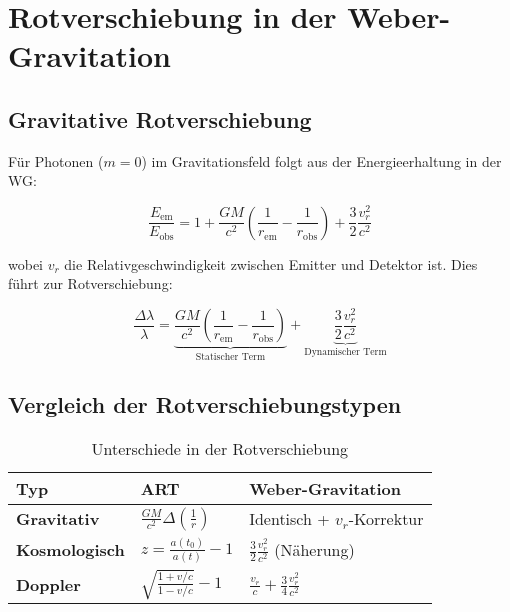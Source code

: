 \newpage
\section{Rotverschiebung in der Weber-Gravitation}

\subsection{Gravitative Rotverschiebung}
Für Photonen ($m=0$) im Gravitationsfeld folgt aus der Energieerhaltung in der WG:

\begin{equation}
\frac{E_\text{em}}{E_\text{obs}} = 1 + \frac{GM}{c^2}\left(\frac{1}{r_\text{em}} - \frac{1}{r_\text{obs}}\right) + \frac{3}{2}\frac{v_r^2}{c^2}
\end{equation}

wobei $v_r$ die Relativgeschwindigkeit zwischen Emitter und Detektor ist. Dies führt zur Rotverschiebung:

\begin{equation}
\frac{\Delta\lambda}{\lambda} = \underbrace{\frac{GM}{c^2}\left(\frac{1}{r_\text{em}} - \frac{1}{r_\text{obs}}\right)}_{\text{Statischer Term}} + \underbrace{\frac{3}{2}\frac{v_r^2}{c^2}}_{\text{Dynamischer Term}}
\end{equation}

\subsection{Vergleich der Rotverschiebungstypen}
\begin{table}[h]
\centering
\caption{Unterschiede in der Rotverschiebung}
\begin{tabular}{lll}
\hline
Typ & ART & Weber-Gravitation \\
\hline
\textbf{Gravitativ} & $\frac{GM}{c^2}\Delta\left(\frac{1}{r}\right)$ & Identisch + $v_r$-Korrektur \\
\textbf{Kosmologisch} & $z = \frac{a(t_0)}{a(t)}-1$ & $\frac{3}{2}\frac{v_r^2}{c^2}$ (Näherung) \\
\textbf{Doppler} & $\sqrt{\frac{1+v/c}{1-v/c}}-1$ & $\frac{v_r}{c} + \frac{3}{4}\frac{v_r^2}{c^2}$ \\
\hline
\end{tabular}
\end{table}

